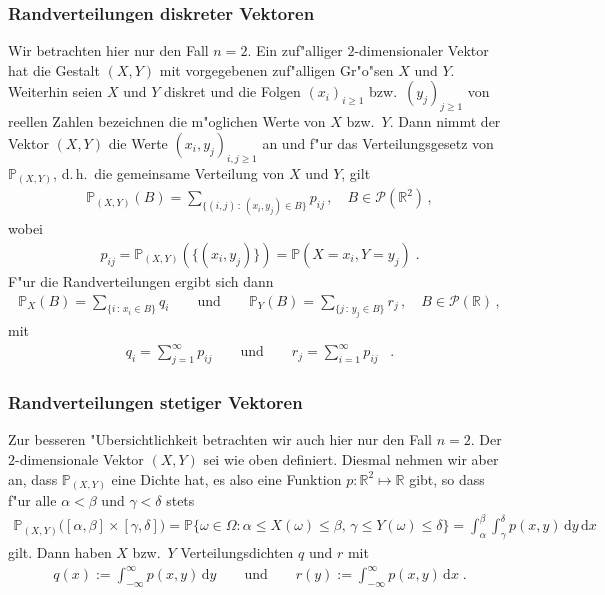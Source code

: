 \documentclass[ngerman,draft,parskip=half,twoside]{scrartcl}
\newcommand*{\R}{\mathbb{R}}      %
\newcommand*{\PotM}{\mathcal{P}}    %
\newcommand*{\WKM}{\mathbb{P}}      %
\begin{document}
\subsubsection{Randverteilungen diskreter Vektoren}
\label{disk}
Wir betrachten hier nur den Fall $n=2$. Ein zuf"alliger $2$-dimensionaler Vektor hat die Gestalt
$(X,Y)$ mit vorgegebenen zuf"alligen Gr"o"sen $X$ und $Y$. Weiterhin seien $X$ und $Y$ diskret und die
Folgen
$(x_i)_{i\ge 1}$ bzw.~$(y_j)_{j\ge 1}$ von reellen Zahlen bezeichnen  die m"oglichen Werte von $X$ bzw.~$Y$.
Dann nimmt der Vektor $(X,Y)$ die Werte $(x_i,y_j)_{i,j\ge 1}$ an und f"ur das Verteilungsgesetz
von $\WKM_{(X,Y)}$, d.\,h.~die gemeinsame Verteilung von $X$ und $Y$, gilt
\begin{gather*}
  \WKM_{(X,Y)}(B)=\sum_{\{(i,j)\,:\, (x_i,y_j)\in B\}} p_{ij}\,,\quad B\in\PotM(\R^2)\,,
\end{gather*}
wobei
\begin{gather*}
  p_{ij}= \WKM_{(X,Y)}(\{(x_i,y_j)\})=\WKM(X=x_i,Y=y_j)\;.
\end{gather*}
F"ur die Randverteilungen ergibt sich dann
\begin{gather*}
  \WKM_X(B)=\sum_{\{i\,:\,x_i\in B\}} q_i \qquad\mbox{und}\qquad
     \WKM_Y(B)=\sum_{\{j\,:\,y_j\in B\}} r_j\,,\quad B\in\PotM(\R)\,,
\end{gather*}
mit
\begin{gather*}
  q_i=\sum_{j=1}^\infty p_{ij}\qquad\mbox{und}\qquad r_j=\sum_{i=1}^\infty p_{ij}\;\;\;.
\end{gather*}
\subsubsection{Randverteilungen stetiger Vektoren}
\label{stet}
Zur besseren "Ubersichtlichkeit betrachten wir auch hier nur den Fall $n=2$. Der
$2$-dimensionale Vektor $(X,Y)$ sei wie oben definiert. Diesmal nehmen wir aber an, dass
$\WKM_{(X,Y)}$ eine Dichte hat, es also eine Funktion $p \colon\R^2\mapsto\R$ gibt, so
dass f"ur alle $\alpha<\beta$ und $\gamma<\delta$ stets
\begin{gather*}
  \WKM_{(X,Y)}\big([\alpha,\beta]\times[\gamma,\delta]\big)
     =\WKM\{\omega\in \Omega : \alpha\le X(\omega)\le\beta,\,\gamma\le Y(\omega)\le\delta\}
     =\int_\alpha^\beta\int_\gamma^\delta p(x,y)\,\mathrm d y \,\mathrm d x
\end{gather*}
gilt. Dann haben $X$ bzw.~$Y$ Verteilungsdichten $q$ und $r$ mit
\begin{gather*}
  q(x):=\int_{-\infty}^\infty p(x,y)\,\mathrm d y\qquad\mbox{und}\qquad
     r(y):=\int_{-\infty}^\infty p(x,y)\,\mathrm d x\;.
\end{gather*}
\end{document}
